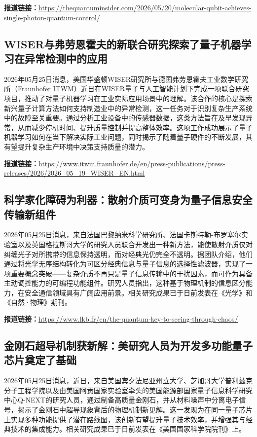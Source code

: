 \documentclass[12pt,a4paper]{ctexart}
\begin{document}
\noindent\textbf{报道链接：}\url{https://thequantuminsider.com/2026/05/20/molecular-qubit-achieves-single-photon-quantum-control/ }

\subsection{ WISER与弗劳恩霍夫的新联合研究探索了量子机器学习在异常检测中的应用 }

2026年05月25日消息，美国华盛顿WISER研究所与德国弗劳恩霍夫工业数学研究所（Fraunhofer ITWM）近日在WISER量子与人工智能计划下完成一项联合研究项目，推动了对量子机器学习在工业实际应用场景中的理解。该合作的核心是探索新兴量子计算方法如何支持制造业中的异常检测，这一任务对于识别复杂生产系统中的故障至关重要。通过分析工业设备中的传感器数据，这类方法旨在及早发现异常，从而减少停机时间、提升质量控制并提高整体效率。这项工作成功展示了量子机器学习如何在当下解决实际工业问题，同时揭示了随着量子硬件的不断发展，其有望提升复杂生产环境中决策支持质量的潜力。

\noindent\textbf{报道链接：}\url{https://www.itwm.fraunhofer.de/en/press-publications/press-releases/2026/2026\_05\_19\_WISER\_EN.html }

\subsection{ 科学家化障碍为利器：散射介质可变身为量子信息安全传输新组件 }

2026年05月25日消息，来自法国巴黎纳米科学研究所、法国卡斯特勒-布罗塞尔实验室以及英国格拉斯哥大学的研究人员联合开发出一种新方法，能使散射介质仅对纠缠光子对所携带的信息保持透明，而对经典光仍完全不透明。据团队介绍，他们通过将光学无序结构转化为可区分经典信息与量子信息的选择性滤波器，实现了一项重要概念突破——复杂介质不再只是量子信息传输中的干扰因素，而可作为具备主动调控能力的可编程功能组件。研究人员指出，这种基于物理机制的信息区分能力，在安全通信领域具有广阔应用前景。相关研究成果已于日前发表在《光学》和《自然·物理》期刊。

\noindent\textbf{报道链接：}\url{https://www.lkb.fr/en/the-quantum-key-to-seeing-through-chaos/ }

\subsection{ 金刚石超导机制获新解：美研究人员为开发多功能量子芯片奠定了基础 }

2026年05月25日消息，近日，来自美国宾夕法尼亚州立大学、芝加哥大学普利兹克分子工程学院以及由美国阿贡国家实验室牵头的美国能源部国家量子信息科学研究中心Q-NEXT的研究人员，通过制备高质量金刚石，并从材料噪声中分离电子信号，揭示了金刚石中超导现象背后的物理机制新见解。这一发现为在同一量子芯片上实现多种功能提供了潜在路线图，该创新有望提升量子技术效率，并增强其与经典技术的集成能力。相关研究成果已于日前发表在《美国国家科学院院刊》上。
\end{document}
